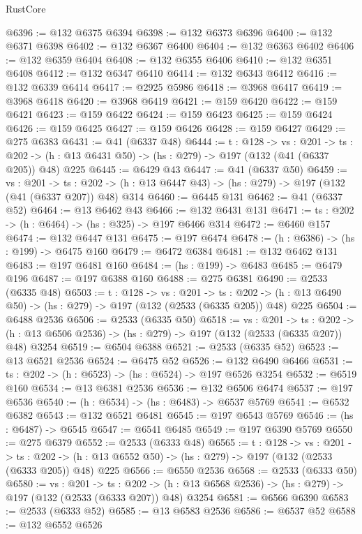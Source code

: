 \begin{lexlean}{RustCore}
\begin{coremodule}
@6396 := @132 @6375 @6394
@6398 := @132 @6373 @6396
@6400 := @132 @6371 @6398
@6402 := @132 @6367 @6400
@6404 := @132 @6363 @6402
@6406 := @132 @6359 @6404
@6408 := @132 @6355 @6406
@6410 := @132 @6351 @6408
@6412 := @132 @6347 @6410
@6414 := @132 @6343 @6412
@6416 := @132 @6339 @6414
@6417 := @2925 @5986
@6418 := @3968 @6417
@6419 := @3968 @6418
@6420 := @3968 @6419
@6421 := @159 @6420
@6422 := @159 @6421
@6423 := @159 @6422
@6424 := @159 @6423
@6425 := @159 @6424
@6426 := @159 @6425
@6427 := @159 @6426
@6428 := @159 @6427
@6429 := @275 @6383
@6431 := @41 (@6337 @48)
@6444 := {t : @128} ->
  {vs : @201} ->
  {ts : @202} -> (h : @13 @6431 @50) -> (hs : @279) -> @197 (@132 (@41 (@6337 @205)) @48) @225
@6445 := @6429 @43
@6447 := @41 (@6337 @50)
@6459 := {vs : @201} ->
  {ts : @202} -> (h : @13 @6447 @43) -> (hs : @279) -> @197 (@132 (@41 (@6337 @207)) @48) @314
@6460 := @6445 @131
@6462 := @41 (@6337 @52)
@6464 := @13 @6462 @43
@6466 := @132 @6431 @131
@6471 := {ts : @202} -> (h : @6464) -> (hs : @325) -> @197 @6466 @314
@6472 := @6460 @157
@6474 := @132 @6447 @131
@6475 := @197 @6474
@6478 := (h : @6386) -> (hs : @199) -> @6475 @160
@6479 := @6472 @6384
@6481 := @132 @6462 @131
@6483 := @197 @6481 @160
@6484 := (hs : @199) -> @6483
@6485 := @6479 @196
@6487 := @197 @6388 @160
@6488 := @275 @6381
@6490 := @2533 (@6335 @48)
@6503 := {t : @128} ->
  {vs : @201} ->
  {ts : @202} -> (h : @13 @6490 @50) -> (hs : @279) -> @197 (@132 (@2533 (@6335 @205)) @48) @225
@6504 := @6488 @2536
@6506 := @2533 (@6335 @50)
@6518 := {vs : @201} ->
  {ts : @202} -> (h : @13 @6506 @2536) -> (hs : @279) -> @197 (@132 (@2533 (@6335 @207)) @48) @3254
@6519 := @6504 @6388
@6521 := @2533 (@6335 @52)
@6523 := @13 @6521 @2536
@6524 := @6475 @52
@6526 := @132 @6490 @6466
@6531 := {ts : @202} -> (h : @6523) -> (hs : @6524) -> @197 @6526 @3254
@6532 := @6519 @160
@6534 := @13 @6381 @2536
@6536 := @132 @6506 @6474
@6537 := @197 @6536
@6540 := (h : @6534) -> (hs : @6483) -> @6537 @5769
@6541 := @6532 @6382
@6543 := @132 @6521 @6481
@6545 := @197 @6543 @5769
@6546 := (hs : @6487) -> @6545
@6547 := @6541 @6485
@6549 := @197 @6390 @5769
@6550 := @275 @6379
@6552 := @2533 (@6333 @48)
@6565 := {t : @128} ->
  {vs : @201} ->
  {ts : @202} -> (h : @13 @6552 @50) -> (hs : @279) -> @197 (@132 (@2533 (@6333 @205)) @48) @225
@6566 := @6550 @2536
@6568 := @2533 (@6333 @50)
@6580 := {vs : @201} ->
  {ts : @202} -> (h : @13 @6568 @2536) -> (hs : @279) -> @197 (@132 (@2533 (@6333 @207)) @48) @3254
@6581 := @6566 @6390
@6583 := @2533 (@6333 @52)
@6585 := @13 @6583 @2536
@6586 := @6537 @52
@6588 := @132 @6552 @6526

\end{coremodule}
\end{lexlean}

